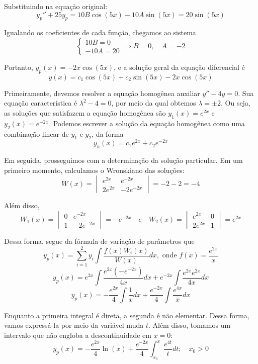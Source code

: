 \documentclass[oneside,12pt,a4paper]{report}
\begin{document}
\begin{resolucao}
    Substituindo na equação original:
    \[y_p'' + 25y_p = 10B\cos(5x) - 10A\sin(5x) = 20\sin(5x)\]

    Igualando os coeficientes de cada função, chegamos ao sistema
    \[\begin{cases}
        10B = 0\\
        -10A = 20
    \end{cases}\Rightarrow B = 0,\quad A = -2\]

    Portanto, $y_p(x) = -2x\cos(5x)$, e a solução geral da equação diferencial é
    \[\boxed{y(x) = c_1\cos(5x) + c_2\sin(5x) - 2x\cos(5x)}\]

\end{resolucao}

\begin{resolucao}
    \itemresolucao Primeiramente, devemos resolver a equação homogênea auxiliar $y''-4y=0$. Sua equação característica é $\lambda^2-4=0$, por meio da qual obtemos $\lambda=\pm2$. Ou seja, as soluções que satisfazem a equação homogênea são $y_1(x) = e^{2x}$ e $y_2(x) = e^{-2x}$. Podemos escrever a solução da equação homogênea como uma combinação linear de $y_1$ e $y_2$, da forma
    \[y_h(x)=c_1e^{2x}+c_2e^{-2x}\]

    Em seguida, prosseguimos com a determinação da solução particular. Em um primeiro momento, calculamos o Wronskiano das soluções:
    \[W(x)=\begin{vmatrix}
        e^{2x} & e^{-2x}\\
        2e^{2x} & -2e^{-2x}
    \end{vmatrix}=-2-2=-4\]

    Além disso,
    \[W_1(x)=\begin{vmatrix}
        0 & e^{-2x}\\
        1 & -2e^{-2x}
    \end{vmatrix}=-e^{-2x}\quad e \quad W_2(x)=\begin{vmatrix}
        e^{2x}  & 0\\
        2e^{2x} & 1
    \end{vmatrix}=e^{2x}\]

    Dessa forma, segue da fórmula de variação de parâmetros que
    \[y_p(x)=\sum_{i=1}^{2}y_i\int\frac{f(x)W_i(x)}{W(x)}dx, \text{ onde } f(x)=\frac{e^{2x}}{x}\]
    \[y_p(x)=e^{2x}\int\frac{e^{2x}(-e^{-2x})}{4x}dx+e^{-2x}\int\frac{e^{2x}e^{2x}}{4x}dx\]
    \[y_p(x)=-\frac{e^{2x}}{4}\int\frac{1}{x}dx+\frac{e^{-2x}}{4}\int\frac{e^{4x}}{x}dx\]

    Enquanto a primeira integral é direta, a segunda é não elementar. Dessa forma, vamos expressá-la por meio da variável muda $t$. Além disso, tomamos um intervalo que não engloba a descontinuidade em $x=0$:
    \[y_p(x)=-\frac{e^{2x}}{4}\ln(x)+\frac{e^{-2x}}{4}\int_{x_0}^{x}\frac{e^{4t}}{t}dt;\quad x_0>0\]


\end{resolucao}
\end{document}
